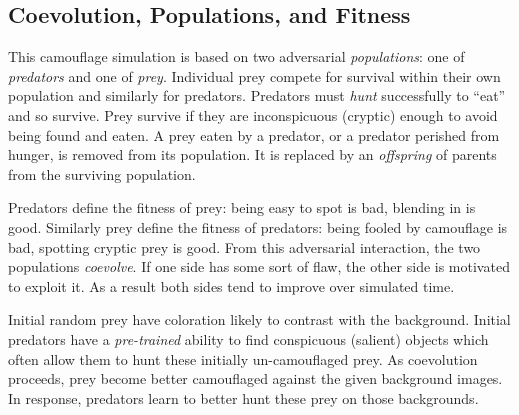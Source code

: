 \documentclass[letterpaper]{article}
\newcommand{\jargon}[1]{\textit{#1}}
\begin{document}
\subsection{Coevolution, Populations, and Fitness}
This camouflage simulation is based on two adversarial \jargon{populations}: one of \jargon{predators} and one of \jargon{prey}. Individual prey compete for survival within their own population and similarly for predators. Predators must \jargon{hunt} successfully to “eat” and so survive. Prey survive if they are inconspicuous (cryptic) enough to avoid being found and eaten. A prey eaten by a predator, or a predator perished from hunger, is removed from its population. It is replaced by an \jargon{offspring} of parents from the surviving population.
\par
Predators define the fitness of prey: being easy to spot is bad, blending in is good. Similarly prey define the fitness of predators: being fooled by camouflage is bad, spotting cryptic prey is good. From this adversarial interaction, the two populations \jargon{coevolve}. If one side has some sort of flaw, the other side is motivated to exploit it. As a result both sides tend to improve over simulated time.
\par
Initial random prey have coloration likely to contrast with the background. Initial predators have a \jargon{pre-trained} ability to find conspicuous (salient) objects which often allow them to hunt these initially un-camouflaged prey. As coevolution proceeds, prey become better camouflaged against the given background images. In response, predators learn to better hunt these prey on those backgrounds.
\par

\end{document}
